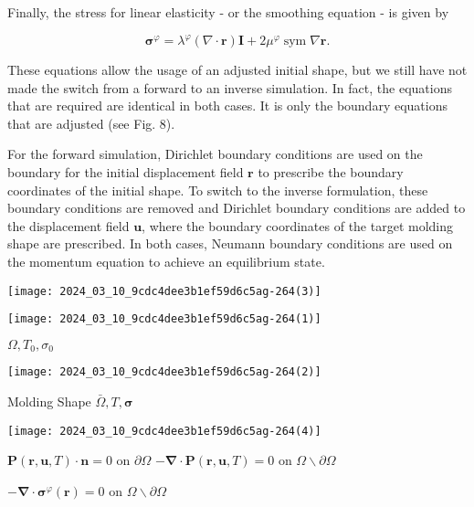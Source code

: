 \documentclass[10pt]{article}
\begin{document}
Finally, the stress for linear elasticity - or the smoothing equation - is given by

$$
\boldsymbol{\sigma}^{\varphi}=\lambda^{\varphi}(\nabla \cdot \mathbf{r}) \mathbf{I}+2 \mu^{\varphi} \operatorname{sym} \nabla \mathbf{r} .
$$

These equations allow the usage of an adjusted initial shape, but we still have not made the switch from a forward to an inverse simulation. In fact, the equations that are required are identical in both cases. It is only the boundary equations that are adjusted (see Fig. 8).

For the forward simulation, Dirichlet boundary conditions are used on the boundary for the initial displacement field $\mathbf{r}$ to prescribe the boundary coordinates of the initial shape. To switch to the inverse formulation, these boundary conditions are removed and Dirichlet boundary conditions are added to the displacement field $\mathbf{u}$, where the boundary coordinates of the target molding shape are prescribed. In both cases, Neumann boundary conditions are used on the momentum equation to achieve an equilibrium state.

\begin{center}
\texttt{[image: 2024\_03\_10\_9cdc4dee3b1ef59d6c5ag-264(3)]}
\end{center}

\begin{center}
\texttt{[image: 2024\_03\_10\_9cdc4dee3b1ef59d6c5ag-264(1)]}
\end{center}

$\Omega, T_{0}, \sigma_{0}$

\begin{center}
\texttt{[image: 2024\_03\_10\_9cdc4dee3b1ef59d6c5ag-264(2)]}
\end{center}

Molding Shape $\bar{\Omega}, T, \boldsymbol{\sigma}$

\begin{center}
\texttt{[image: 2024\_03\_10\_9cdc4dee3b1ef59d6c5ag-264(4)]}
\end{center}

$\mathbf{P}(\mathbf{r}, \mathbf{u}, T) \cdot \mathbf{n}=0$ on $\partial \Omega$ $-\boldsymbol{\nabla} \cdot \mathbf{P}(\mathbf{r}, \mathbf{u}, T)=0$ on $\Omega \backslash \partial \Omega$

$-\boldsymbol{\nabla} \cdot \boldsymbol{\sigma}^{\varphi}(\mathbf{r})=0$ on $\Omega \backslash \partial \Omega$
\end{document}
